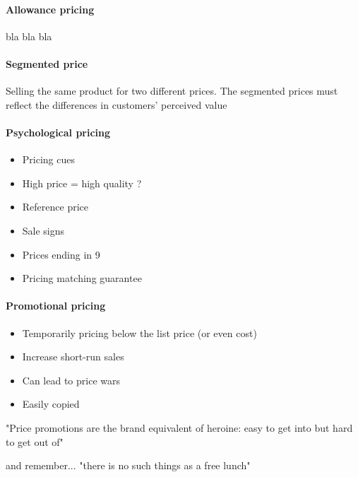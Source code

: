 \documentclass[a4paper,titlepage] {scrartcl}
\begin{document}
\paragraph{Allowance pricing} %
\label{par:allowance_pricing}
bla bla bla

\paragraph{Segmented price} %
\label{par:segmented_price}
Selling the same product for two different prices. The segmented prices must reflect the differences in customers' perceived value

\paragraph{Psychological pricing} %
\label{par:psychological_pricing}
\begin{itemize}
	\item Pricing cues
	\item High price = high quality ?
	\item Reference price
	\item Sale signs
	\item Prices ending in 9
	\item Pricing matching guarantee
\end{itemize}

\paragraph{Promotional pricing} %
\label{par:promotional_pricing}
\begin{itemize}
	\item Temporarily pricing below the list price (or even cost)
	\item Increase short-run sales
	\item Can lead to price wars
	\item Easily copied
\end{itemize}

"Price promotions are the brand equivalent of heroine: easy to get into but hard to get out of"

and remember... "there is no such things as a free lunch"

\end{document}
